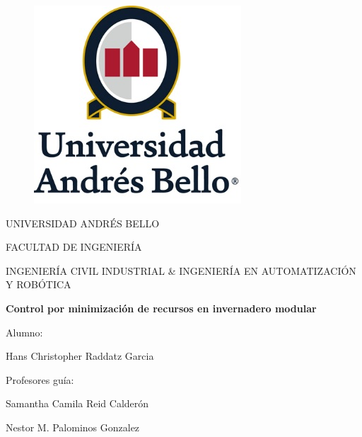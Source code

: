 \documentclass[12pt,a4paper]{article}
\begin{document}



\begin{titlepage}

\begin{center}
\begin{figure}[htb]
\begin{center}
\includegraphics[scale=0.7]{imagenes/logo_u.png}			%
\end{center}
\end{figure}

\vspace*{2cm}

UNIVERSIDAD ANDRÉS BELLO

FACULTAD DE INGENIERÍA

INGENIERÍA CIVIL INDUSTRIAL
\&
INGENIERÍA EN AUTOMATIZACIÓN Y ROBÓTICA

\vspace*{2.5cm}

\begin{huge}
\textbf{Control por minimización de recursos en invernadero modular}
\end{huge}

\vspace*{2.5cm}
Alumno:

Hans Christopher Raddatz Garcia

\vspace*{0.5cm}
Profesores guía:
\vspace*{0.5cm}

Samantha Camila Reid Calderón



Nestor M. Palominos Gonzalez

\vspace*{2cm}

\begin{flushright}


\end{flushright}
\end{center}
\end{titlepage}
\end{document}

